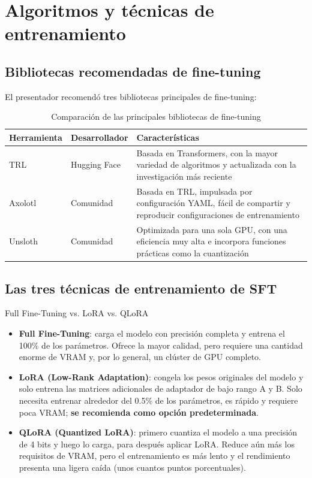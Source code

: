 \section{Algoritmos y técnicas de entrenamiento}

\subsection{Bibliotecas recomendadas de fine-tuning}

El presentador recomendó tres bibliotecas principales de fine-tuning:

\begin{table}[H]
\centering
\caption{Comparación de las principales bibliotecas de fine-tuning}
\begin{tabular}{llp{7cm}}
\toprule
\textbf{Herramienta} & \textbf{Desarrollador} & \textbf{Características} \\
\midrule
TRL & Hugging Face & Basada en Transformers, con la mayor variedad de algoritmos y actualizada con la investigación más reciente \\
Axolotl & Comunidad & Basada en TRL, impulsada por configuración YAML, fácil de compartir y reproducir configuraciones de entrenamiento \\
Unsloth & Comunidad & Optimizada para una sola GPU, con una eficiencia muy alta e incorpora funciones prácticas como la cuantización \\
\bottomrule
\end{tabular}
\end{table}

\subsection{Las tres técnicas de entrenamiento de SFT}

\begin{importantbox}{Full Fine-Tuning vs. LoRA vs. QLoRA}
\begin{itemize}
    \item \textbf{Full Fine-Tuning}: carga el modelo con precisión completa y entrena el 100\% de los parámetros. Ofrece la mayor calidad, pero requiere una cantidad enorme de VRAM y, por lo general, un clúster de GPU completo.
    \item \textbf{LoRA (Low-Rank Adaptation)}: congela los pesos originales del modelo y solo entrena las matrices adicionales de adaptador de bajo rango A y B. Solo necesita entrenar alrededor del 0.5\% de los parámetros, es rápido y requiere poca VRAM; \textbf{se recomienda como opción predeterminada}.
    \item \textbf{QLoRA (Quantized LoRA)}: primero cuantiza el modelo a una precisión de 4 bits y luego lo carga, para después aplicar LoRA. Reduce aún más los requisitos de VRAM, pero el entrenamiento es más lento y el rendimiento presenta una ligera caída (unos cuantos puntos porcentuales).
\end{itemize}
\end{importantbox}

